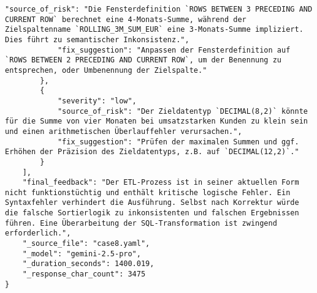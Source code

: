 \begin{lstlisting}[caption={Ausgabe: GEMINI 2.5 Pro Anwendungsfall 8 Hauptdurchlauf},label={gemini_case8_prompt1}]
            "source_of_risk": "Die Fensterdefinition `ROWS BETWEEN 3 PRECEDING AND CURRENT ROW` berechnet eine 4-Monats-Summe, während der Zielspaltenname `ROLLING_3M_SUM_EUR` eine 3-Monats-Summe impliziert. Dies führt zu semantischer Inkonsistenz.",
            "fix_suggestion": "Anpassen der Fensterdefinition auf `ROWS BETWEEN 2 PRECEDING AND CURRENT ROW`, um der Benennung zu entsprechen, oder Umbenennung der Zielspalte."
        },
        {
            "severity": "low",
            "source_of_risk": "Der Zieldatentyp `DECIMAL(8,2)` könnte für die Summe von vier Monaten bei umsatzstarken Kunden zu klein sein und einen arithmetischen Überlauffehler verursachen.",
            "fix_suggestion": "Prüfen der maximalen Summen und ggf. Erhöhen der Präzision des Zieldatentyps, z.B. auf `DECIMAL(12,2)`."
        }
    ],
    "final_feedback": "Der ETL-Prozess ist in seiner aktuellen Form nicht funktionstüchtig und enthält kritische logische Fehler. Ein Syntaxfehler verhindert die Ausführung. Selbst nach Korrektur würde die falsche Sortierlogik zu inkonsistenten und falschen Ergebnissen führen. Eine Überarbeitung der SQL-Transformation ist zwingend erforderlich.",
    "_source_file": "case8.yaml",
    "_model": "gemini-2.5-pro",
    "_duration_seconds": 1400.019,
    "_response_char_count": 3475
}
\end{lstlisting}

